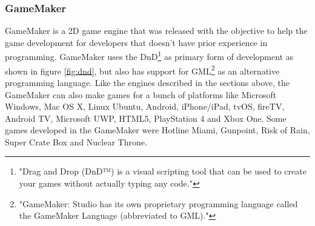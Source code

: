 \subsubsection{GameMaker}

\begin{figure*}[!t]
\centering
{} \caption{Game Maker Drag and Drop \cite{GameMakerDragNDrop}}
\label{fig:dnd}
\end{figure*}

GameMaker is a 2D game engine that was released with the objective to help the game development for developers that doesn't have prior experience in programming. GameMaker uses the DnD\footnote{"Drag and Drop (DnD™) is a visual scripting tool that can be used to create your games without actually typing any code."\cite{GameMakerDragNDrop}} as primary form of development as shown in figure \ref{fig:dnd}, but also has support for GML\footnote{"GameMaker: Studio has its own proprietary programming language called the GameMaker Language (abbreviated to GML)."\cite{GML}} as an alternative programming language\cite{TheGameMakerStandard}. Like the engines described in the sections above, the GameMaker can also make games for a bunch of platforms like Microsoft Windows, Mac OS X, Linux Ubuntu, Android, iPhone/iPad, tvOS, fireTV, Android TV, Microsoft UWP, HTML5, PlayStation 4 and Xbox One\cite{GameMaker}. Some games developed in the GameMaker were Hotline Miami, Gunpoint, Risk of Rain, Super Crate Box and Nuclear Throne\cite{TheGameMakerStandard}.
